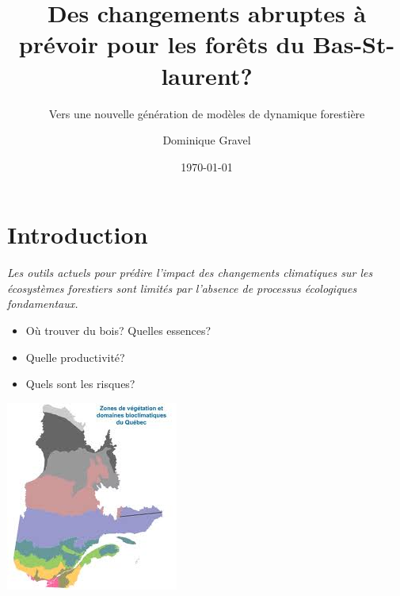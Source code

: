 \documentclass{eecslides}
\title[Forêts-CC]{Des changements abruptes à prévoir pour les forêts du Bas-St-laurent?}
\subtitle{Vers une nouvelle génération de modèles de dynamique forestière}
\author[D. Gravel]{Dominique Gravel}
\institute[Chaire de recherche EEC]{UQAR -- Chaire de Recherche EEC}
\date{\today}
\begin{document}

	\begin{frame}[plain]
		\titlepage
	\end{frame}
	
	\section{Introduction}

	\begin{frame}

		\textit{Les outils actuels pour prédire l'impact des changements climatiques sur les écosystèmes forestiers sont limités par l'absence de processus écologiques fondamentaux.}

	\end{frame}


	\begin{frame}
		\begin{center}
				\begin{itemize}
					\item Où trouver du bois? Quelles essences?
					\item Quelle productivité?
					\item Quels sont les risques?			
				\end{itemize}
		\end{center}

	\end{frame}


	\begin{frame}
		\begin{center}
			\includegraphics[height=0.75\textheight]{bioclim_MRN}
		\end{center}
	\end{frame}
\end{document}
